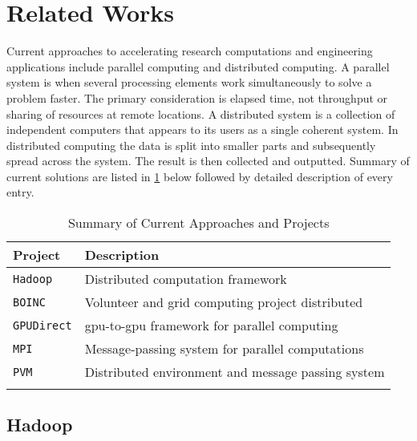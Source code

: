 \section{Related Works}

Current approaches to accelerating research computations and engineering
applications include parallel computing and distributed computing. A parallel
system is when several processing elements work simultaneously to solve a
problem faster. The primary consideration is elapsed time, not throughput or
sharing of resources at remote locations. A distributed system is a collection
of independent computers that appears to its users as a single coherent system.
In distributed computing the data is split into smaller parts and subsequently
spread across the system. The result is then collected and outputted. Summary
of current solutions are listed in \cref{tab:relatedProjects} below followed by
detailed description of every entry.\\

\begin{table}[htb]
\centering
\begin{tabular}{ll}
\toprule{}
\textbf{Project}   & \textbf{Description} \\
\midrule{}
\texttt{Hadoop}    & Distributed computation framework
                     \cite{website:Hadoop-Wiki} \cite{website:Apache-Hadoop}
                     \cite{shvachko2011apache}\\
\midrule{}
\texttt{BOINC}     & Volunteer and grid computing project distributed
                     \cite{anderson2004boinc} \\
\midrule{}
\texttt{GPUDirect} & \gls{gpu}-to-\gls{gpu} framework for parallel computing
                     \cite{website:youtube_gpudirect} \\
\midrule{}
\texttt{MPI}       & Message-passing system for parallel computations
                     \cite{website:MPI-Tutorial} \cite{website:mpi-4-python} \\
\midrule{}
\texttt{PVM}       & Distributed environment and message passing system
                     \cite{website:Computer-Science-and-Division} \\
\bottomrule{}
\end{tabular}
\caption{Summary of Current Approaches and Projects}
\label{tab:relatedProjects}
\end{table}

\subsection{Hadoop}

